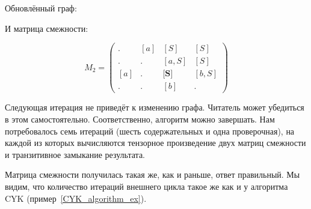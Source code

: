 \begin{example}
Обновлённый граф:
\begin{center}
\end{center}
  

И матрица смежности:

$$ M_2 =
\begin{pmatrix} 
. & [a] & [S] & [S] \\
. & . & [a, S] & [S] \\
[a] & . & \textbf{[S]} & [b,S] \\
. & . & [b] & . 
\end{pmatrix}
$$


Следующая итерация не приведёт к изменению графа.
Читатель может убедиться в этом самостоятельно.
Соответственно, алгоритм можно завершать.
Нам потребовалось семь итераций (шесть содержательных и одна проверочная), на каждой из которых вычисляются тензорное произведение двух матриц смежности и транзитивное замыкание результата.

Матрица смежности получилась такая же, как и раньше, ответ правильный.
Мы видим, что количество итераций внешнего цикла такое же как и у алгоритма CYK (пример~\ref{CYK_algorithm_ex}).

\end{example}


